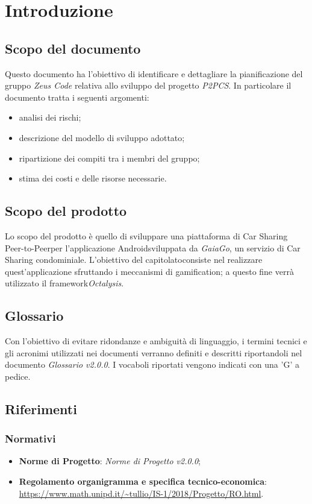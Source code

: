\section{Introduzione}
\subsection{Scopo del documento}
Questo documento ha l'obiettivo di identificare e dettagliare la pianificazione del gruppo \textit{Zeus Code} relativa allo sviluppo del progetto \textit{P2PCS}. In particolare il documento tratta i seguenti argomenti:
\begin{itemize}
	\item analisi dei rischi;
	\item descrizione del modello di sviluppo adottato;
	\item ripartizione dei compiti tra i membri del gruppo;
	\item stima dei costi e delle risorse necessarie.
\end{itemize}
\subsection{Scopo del prodotto}
Lo scopo del prodotto è quello di sviluppare una piattaforma di Car Sharing Peer-to-Peer\glosp per l'applicazione Android\glosp sviluppata da \textit{GaiaGo}, un servizio di Car Sharing condominiale. L'obiettivo del capitolato\glosp consiste nel realizzare quest'applicazione sfruttando i meccanismi di gamification\glo; a questo fine
verrà utilizzato il framework\glosp \textit{Octalysis}\glo.
\subsection{Glossario}
Con l'obiettivo di evitare ridondanze e ambiguità di linguaggio, i termini tecnici e gli acronimi
utilizzati nei documenti verranno definiti e descritti riportandoli nel documento \textit{Glossario v2.0.0}.
I vocaboli riportati vengono indicati con una 'G' a pedice.
\subsection{Riferimenti}
\subsubsection{Normativi}
\begin{itemize}
	\item \textbf{Norme di Progetto}: \textit{Norme di Progetto v2.0.0};
	\item \textbf{Regolamento organigramma e specifica tecnico-economica}: \\
	\url{https://www.math.unipd.it/~tullio/IS-1/2018/Progetto/RO.html}.
\end{itemize}

